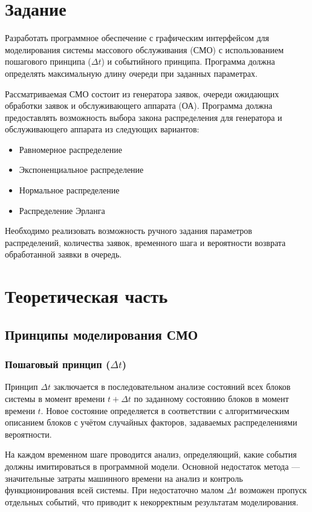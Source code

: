 \section{Задание}

Разработать программное обеспечение с графическим интерфейсом для моделирования системы массового обслуживания (СМО) с использованием пошагового принципа ($\Delta t$) и событийного принципа. Программа должна определять максимальную длину очереди при заданных параметрах.

Рассматриваемая СМО состоит из генератора заявок, очереди ожидающих обработки заявок и обслуживающего аппарата (ОА). Программа должна предоставлять возможность выбора закона распределения для генератора и обслуживающего аппарата из следующих вариантов:

\begin{itemize}
    \item Равномерное распределение
    \item Экспоненциальное распределение
    \item Нормальное распределение
    \item Распределение Эрланга
\end{itemize}

Необходимо реализовать возможность ручного задания параметров распределений, количества заявок, временного шага и вероятности возврата обработанной заявки в очередь.

\section{Теоретическая часть}

\subsection{Принципы моделирования СМО}

\subsubsection{Пошаговый принцип ($\Delta t$)}

Принцип $\Delta t$ заключается в последовательном анализе состояний всех блоков системы в момент времени $t + \Delta t$ по заданному состоянию блоков в момент времени $t$. Новое состояние определяется в соответствии с алгоритмическим описанием блоков с учётом случайных факторов, задаваемых распределениями вероятности.

На каждом временном шаге проводится анализ, определяющий, какие события должны имитироваться в программной модели. Основной недостаток метода — значительные затраты машинного времени на анализ и контроль функционирования всей системы. При недостаточно малом $\Delta t$ возможен пропуск отдельных событий, что приводит к некорректным результатам моделирования.

